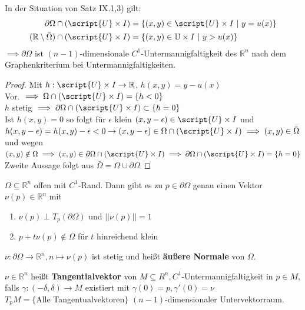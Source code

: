 \begin{lemma}
  In der Situation von Satz IX.1,3) gilt:
  \begin{align*}
    \partial \Omega \cap(\script{U}\times I) &= \{(x,y) \in \script{U} \times I \ | \ y = u(x)\}\\
    (\mathbb{R}\setminus \bar{\Omega}) \cap (\script{U}\times I) &= \{(x,y) \in \mathbb{U} \times I \ | \ y > u(x)\}
  \end{align*}
  $\implies \partial \Omega$ ist $(n-1)$-dimensionale $C^1$-Untermannigfaltigkeit des $\mathbb{R}^n$ nach dem Graphenkriterium bei Untermannigfaltigkeiten.
\end{lemma}
\begin{proof}
  Mit $h: \script{U} \times I \to \mathbb{R}$, $h(x,y) = y-u(x)$ \\
  Vor. $\implies \Omega \cap (\script{U}\times I) = \{ h<0 \}$ \\
  $h$ stetig $\implies \partial \Omega \cap (\script{U}\times I) \subset \{ h=0\}$ \\
  Ist $h(x,y) = 0$ so folgt für $\epsilon$ klein $(x,y-\epsilon)\in\script{U}\times I$ und $h(x,y-\epsilon) = h(x,y) - \epsilon < 0 \rightarrow (x,y-\epsilon)\in\Omega \cap (\script{U}\times I)\\
  \implies (x,y) \in \bar{\Omega}$ und wegen $(x,y) \notin \Omega \implies (x,y) \in \partial\Omega \cap (\script{U}\times I) \implies \partial\Omega \cap (\script{U}\times I) = \{ h=0\}$ \\
  Zweite Aussage folgt aus $\bar{\Omega} = \Omega \cup \partial\Omega$
\end{proof}

\begin{lemma}
  $\Omega \subseteq \mathbb{R}^n$ offen mit $C^1$-Rand. Dann gibt es zu $p \in \partial\Omega$ genau einen Vektor $\nu(p)\in \mathbb{R}^n$ mit
  \begin{enumerate}
    \item $\nu(p) \perp T_p(\partial \Omega)$ und $||\nu(p)|| = 1$
    \item $p + t \nu(p) \notin \Omega$ für $t$ hinreichend klein
  \end{enumerate}
  $\nu:\partial\Omega\to\mathbb{R}^n, n \mapsto \nu(p)$ ist stetig und heißt \textbf{äußere Normale} von $\Omega$.
\end{lemma}

\begin{remark}
  $\nu \in \mathbb{R}^n$ heißt \textbf{Tangentialvektor} von $M \subseteq R^n, C^1$-Untermannigfaltigkeit in $p\in M$, falls $\gamma:(-\delta, \delta) \to M$ existiert mit $\gamma(0) = p, \gamma'(0) = \nu$\\
  $T_pM = \{$Alle Tangentualvektoren$\}$ $(n-1)$-dimensionaler Untervektorraum.
\end{remark}

